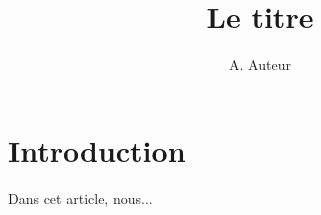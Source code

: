 \documentclass{article}
\title{Le titre}
\author{A. Auteur}
\begin{document}
\maketitle

\section{Introduction}

Dans cet article, nous...
\end{document}
